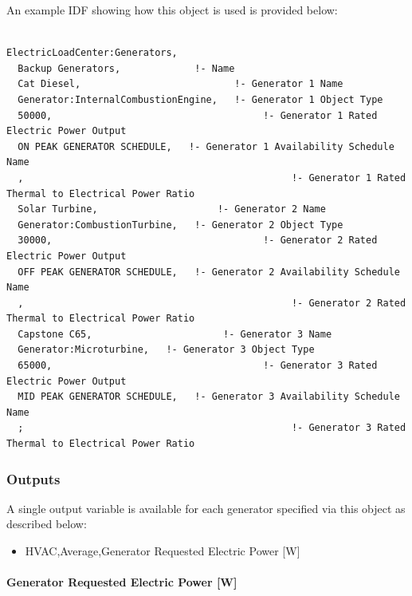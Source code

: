 An example IDF showing how this object is used is provided below:

\begin{lstlisting}

ElectricLoadCenter:Generators,
  Backup Generators,             !- Name
  Cat Diesel,                           !- Generator 1 Name
  Generator:InternalCombustionEngine,   !- Generator 1 Object Type
  50000,                                     !- Generator 1 Rated Electric Power Output
  ON PEAK GENERATOR SCHEDULE,   !- Generator 1 Availability Schedule Name
  ,                                               !- Generator 1 Rated Thermal to Electrical Power Ratio
  Solar Turbine,                     !- Generator 2 Name
  Generator:CombustionTurbine,   !- Generator 2 Object Type
  30000,                                     !- Generator 2 Rated Electric Power Output
  OFF PEAK GENERATOR SCHEDULE,   !- Generator 2 Availability Schedule Name
  ,                                               !- Generator 2 Rated Thermal to Electrical Power Ratio
  Capstone C65,                       !- Generator 3 Name
  Generator:Microturbine,   !- Generator 3 Object Type
  65000,                                     !- Generator 3 Rated Electric Power Output
  MID PEAK GENERATOR SCHEDULE,   !- Generator 3 Availability Schedule Name
  ;                                               !- Generator 3 Rated Thermal to Electrical Power Ratio
\end{lstlisting}

\subsubsection{Outputs}\label{outputs-2-007}

A single output variable is available for each generator specified via this object as described below:

\begin{itemize}
\tightlist
\item
  HVAC,Average,Generator Requested Electric Power {[}W{]}
\end{itemize}

\paragraph{Generator Requested Electric Power {[}W{]}}\label{generator-requested-electric-power-w}

